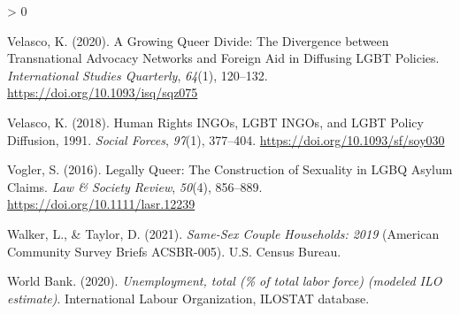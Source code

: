 \documentclass[
  11pt,
]{article}
\newlength{\cslhangindent}
\newenvironment{CSLReferences}[2] %
 {%
  \setlength{\parindent}{0pt}
  \ifodd #1 \everypar{\setlength{\hangindent}{\cslhangindent}}\ignorespaces\fi
  \ifnum #2 > 0
  \setlength{\parskip}{#2\baselineskip}
  \fi
 }%
 {}
\begin{document}
\begin{CSLReferences}{1}{0}
\leavevmode\hypertarget{ref-velasco_2020}{}%
Velasco, K. (2020). A {Growing Queer Divide}: {The Divergence} between {Transnational Advocacy Networks} and {Foreign Aid} in {Diffusing LGBT Policies}. \emph{International Studies Quarterly}, \emph{64}(1), 120--132. \url{https://doi.org/10.1093/isq/sqz075}

\leavevmode\hypertarget{ref-velasco_2018}{}%
Velasco, K. (2018). Human {Rights INGOs}, {LGBT INGOs}, and {LGBT Policy Diffusion}, 1991{}. \emph{Social Forces}, \emph{97}(1), 377--404. \url{https://doi.org/10.1093/sf/soy030}

\leavevmode\hypertarget{ref-vogler_2016}{}%
Vogler, S. (2016). Legally {Queer}: {The Construction} of {Sexuality} in {LGBQ Asylum Claims}. \emph{Law \& Society Review}, \emph{50}(4), 856--889. \url{https://doi.org/10.1111/lasr.12239}

\leavevmode\hypertarget{ref-walker_2021}{}%
Walker, L., \& Taylor, D. (2021). \emph{Same-{Sex Couple Households}: 2019} (American Community Survey Briefs ACSBR-005). {U.S. Census Bureau}.

\leavevmode\hypertarget{ref-worldbank_2020}{}%
World Bank. (2020). \emph{Unemployment, total (\% of total labor force) (modeled {ILO} estimate)}. {International Labour Organization, ILOSTAT database.}

\end{CSLReferences}
\end{document}
